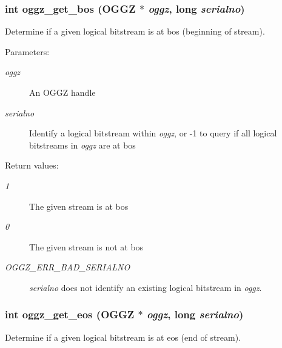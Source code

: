 \subsubsection{\setlength{\rightskip}{0pt plus 5cm}int oggz\_\-get\_\-bos ({\bf OGGZ} $\ast$ {\em oggz}, long {\em serialno})}\label{oggz_8h_a9}


Determine if a given logical bitstream is at bos (beginning of stream). 

\begin{Desc}
\item[Parameters:]
\begin{description}
\item[{\em oggz}]An OGGZ handle \item[{\em serialno}]Identify a logical bitstream within {\em oggz\/}, or -1 to query if all logical bitstreams in {\em oggz\/} are at bos \end{description}
\end{Desc}
\begin{Desc}
\item[Return values:]
\begin{description}
\item[{\em 1}]The given stream is at bos \item[{\em 0}]The given stream is not at bos \item[{\em OGGZ\_\-ERR\_\-BAD\_\-SERIALNO}]{\em serialno\/} does not identify an existing logical bitstream in {\em oggz\/}. \end{description}
\end{Desc}
\subsubsection{\setlength{\rightskip}{0pt plus 5cm}int oggz\_\-get\_\-eos ({\bf OGGZ} $\ast$ {\em oggz}, long {\em serialno})}\label{oggz_8h_a10}


Determine if a given logical bitstream is at eos (end of stream). 

